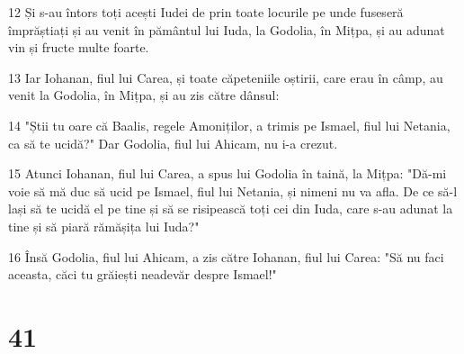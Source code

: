 \par 12 Și s-au întors toți acești Iudei de prin toate locurile pe unde fuseseră împrăștiați și au venit în pământul lui Iuda, la Godolia, în Mițpa, și au adunat vin și fructe multe foarte.
\par 13 Iar Iohanan, fiul lui Carea, și toate căpeteniile oștirii, care erau în câmp, au venit la Godolia, în Mițpa, și au zis către dânsul:
\par 14 "Știi tu oare că Baalis, regele Amoniților, a trimis pe Ismael, fiul lui Netania, ca să te ucidă?" Dar Godolia, fiul lui Ahicam, nu i-a crezut.
\par 15 Atunci Iohanan, fiul lui Carea, a spus lui Godolia în taină, la Mițpa: "Dă-mi voie să mă duc să ucid pe Ismael, fiul lui Netania, și nimeni nu va afla. De ce să-l lași să te ucidă el pe tine și să se risipească toți cei din Iuda, care s-au adunat la tine și să piară rămășița lui Iuda?"
\par 16 Însă Godolia, fiul lui Ahicam, a zis către Iohanan, fiul lui Carea: "Să nu faci aceasta, căci tu grăiești neadevăr despre Ismael!"

\chapter{41}

